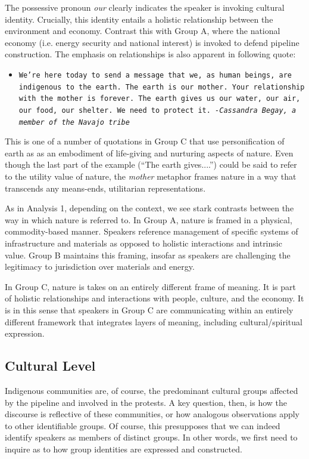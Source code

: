 The possessive pronoun \textit{our} clearly indicates the speaker is invoking cultural identity. Crucially, this identity entails a holistic relationship between the environment and economy. Contrast this with Group A, where the national economy (i.e. energy security and national interest) is invoked to defend pipeline construction. The emphasis on relationships is also apparent in following quote: 

\begin{footnotesize}
\begin{itemize}
\item[] \texttt{We're here today to send a message that we, as human beings, are indigenous to the earth. The earth is our mother. Your relationship with the mother is forever. The earth gives us our water, our air, our food, our shelter. We need to protect it.  \newline
\textit{-Cassandra Begay, a member of the Navajo tribe}}
\end{itemize}
\end{footnotesize}

This is one of a number of quotations in Group C that use personification of earth as  as an embodiment of life-giving and nurturing aspects of nature. Even though the last part of the example (``The earth gives....'') could be said to refer to the utility value of nature, the \textit{mother} metaphor frames nature in a way that transcends any means-ends, utilitarian representations. 

As in Analysis 1, depending on the context, we see stark contrasts between the way in which nature is referred to. In Group A, nature is framed in a physical, commodity-based manner. Speakers reference management of specific systems of infrastructure and materials as opposed to holistic interactions and intrinsic value. Group B maintains this framing, insofar as speakers are challenging the legitimacy to jurisdiction over materials and energy. 

In Group C, nature is takes on an entirely different frame of meaning. It is part of holistic relationships and interactions with people, culture, and the economy. It is in this sense that speakers in Group C are communicating within an entirely different framework that integrates layers of meaning, including cultural/spiritual expression. 
  
\subsection{Cultural Level}
Indigenous communities are, of course, the predominant cultural groups affected by the pipeline and involved in the protests. A key question, then, is how the discourse is reflective of these communities, or how analogous observations apply to other identifiable groups. Of course, this presupposes that we can indeed identify speakers as members of distinct groups. In other words, we first need to inquire as to how group identities are expressed and constructed. 

